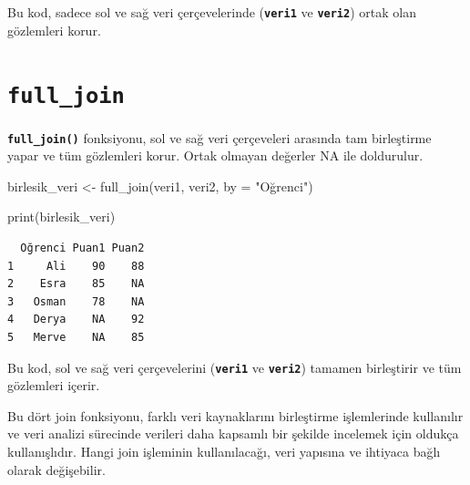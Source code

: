 \documentclass[
  letterpaper,
  DIV=11,
  numbers=noendperiod]{scrreprt}
\newenvironment{Shaded}{\begin{snugshade}}{\end{snugshade}}
\newcommand{\AttributeTok}[1]{\textcolor[rgb]{0.40,0.45,0.13}{#1}}
\newcommand{\FunctionTok}[1]{\textcolor[rgb]{0.28,0.35,0.67}{#1}}
\newcommand{\NormalTok}[1]{\textcolor[rgb]{0.00,0.23,0.31}{#1}}
\newcommand{\OtherTok}[1]{\textcolor[rgb]{0.00,0.23,0.31}{#1}}
\newcommand{\StringTok}[1]{\textcolor[rgb]{0.13,0.47,0.30}{#1}}
\begin{document}
Bu kod, sadece sol ve sağ veri çerçevelerinde (\textbf{\texttt{veri1}}
ve \textbf{\texttt{veri2}}) ortak olan gözlemleri korur.

\section*{\texorpdfstring{\textbf{\texttt{full\_join}}}{full\_join}}\label{full_join}


\textbf{\texttt{full\_join()}} fonksiyonu, sol ve sağ veri çerçeveleri
arasında tam birleştirme yapar ve tüm gözlemleri korur. Ortak olmayan
değerler NA ile doldurulur.

\begin{Shaded}
\begin{Highlighting}[]
\NormalTok{birlesik\_veri }\OtherTok{\textless{}{-}} \FunctionTok{full\_join}\NormalTok{(veri1, veri2, }\AttributeTok{by =} \StringTok{"Oğrenci"}\NormalTok{)}

\FunctionTok{print}\NormalTok{(birlesik\_veri)}
\end{Highlighting}
\end{Shaded}

\begin{verbatim}
  Oğrenci Puan1 Puan2
1     Ali    90    88
2    Esra    85    NA
3   Osman    78    NA
4   Derya    NA    92
5   Merve    NA    85
\end{verbatim}

Bu kod, sol ve sağ veri çerçevelerini (\textbf{\texttt{veri1}} ve
\textbf{\texttt{veri2}}) tamamen birleştirir ve tüm gözlemleri içerir.

\begin{tcolorbox}[enhanced jigsaw, colback=white, coltitle=black, colbacktitle=quarto-callout-note-color!10!white, opacitybacktitle=0.6, opacityback=0, toprule=.15mm, bottomrule=.15mm, bottomtitle=1mm, rightrule=.15mm, breakable, arc=.35mm, colframe=quarto-callout-note-color-frame, titlerule=0mm, left=2mm, leftrule=.75mm, toptitle=1mm, title=\textcolor{quarto-callout-note-color}{\faInfo}\hspace{0.5em}{Not}]

Bu dört join fonksiyonu, farklı veri kaynaklarını birleştirme
işlemlerinde kullanılır ve veri analizi sürecinde verileri daha kapsamlı
bir şekilde incelemek için oldukça kullanışlıdır. Hangi join işleminin
kullanılacağı, veri yapısına ve ihtiyaca bağlı olarak değişebilir.

\end{tcolorbox}
\end{document}
